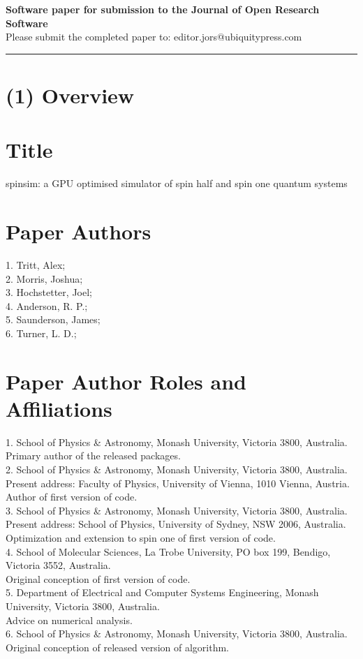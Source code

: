 \documentclass{jors}
\begin{document}
{\bf Software paper for submission to the Journal of Open Research Software} \\

Please submit the completed paper to: editor.jors@ubiquitypress.com

\rule{\textwidth}{1pt}

\section{(1) Overview}

\vspace{0.5cm}

\section{Title}
spinsim: a GPU optimised simulator of spin half and spin one quantum systems

\section{Paper Authors}
1. Tritt, Alex;\\
2. Morris, Joshua;\\
3. Hochstetter, Joel;\\
4. Anderson, R. P.;\\
5. Saunderson, James;\\
6. Turner, L. D.;\\

\section{Paper Author Roles and Affiliations}
1. School of Physics \& Astronomy, Monash University, Victoria 3800, Australia.\\
	Primary author of the released packages.\\
2. School of Physics \& Astronomy, Monash University, Victoria 3800, Australia.\\
	Present address: Faculty of Physics, University of Vienna, 1010 Vienna, Austria.\\
	Author of first version of code.\\
3. School of Physics \& Astronomy, Monash University, Victoria 3800, Australia.\\
	Present address: School of Physics, University of Sydney, NSW 2006, Australia.\\
	Optimization and extension to spin one of first version of code.\\
4. School of Molecular Sciences, La Trobe University, PO box 199, Bendigo, Victoria 3552, Australia.\\
	Original conception of first version of code.\\
5. Department of Electrical and Computer Systems Engineering, Monash University, Victoria 3800, Australia.\\
	Advice on numerical analysis.\\
6. School of Physics \& Astronomy, Monash University, Victoria 3800, Australia.\\
	Original conception of released version of algorithm.
\end{document}
